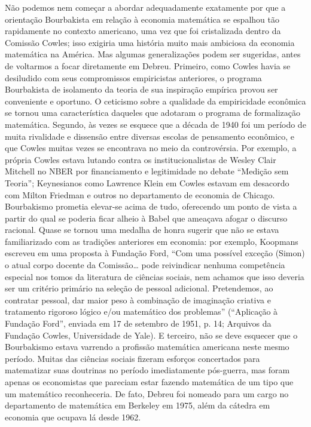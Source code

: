 \documentclass[12pt]{article}
\begin{document}
Não podemos nem começar a abordar adequadamente exatamente por que a orientação Bourbakista em relação à economia matemática se espalhou tão rapidamente no contexto americano, uma vez que foi cristalizada dentro da Comissão Cowles; isso exigiria uma história muito mais ambiciosa da economia matemática na América. Mas algumas generalizações podem ser sugeridas, antes de voltarmos a focar diretamente em Debreu. Primeiro, como Cowles havia se desiludido com seus compromissos empiricistas anteriores, o programa Bourbakista de isolamento da teoria de sua inspiração empírica provou ser conveniente e oportuno. O ceticismo sobre a qualidade da empiricidade econômica se tornou uma característica daqueles que adotaram o programa de formalização matemática. Segundo, às vezes se esquece que a década de 1940 foi um período de muita rivalidade e dissensão entre diversas escolas de pensamento econômico, e que Cowles muitas vezes se encontrava no meio da controvérsia. Por exemplo, a própria Cowles estava lutando contra os institucionalistas de Wesley Clair Mitchell no NBER por financiamento e legitimidade no debate “Medição sem Teoria”; Keynesianos como Lawrence Klein em Cowles estavam em desacordo com Milton Friedman e outros no departamento de economia de Chicago. Bourbakismo prometia elevar-se acima de tudo, oferecendo um ponto de vista a partir do qual se poderia ficar alheio à Babel que ameaçava afogar o discurso racional. Quase se tornou uma medalha de honra sugerir que não se estava familiarizado com as tradições anteriores em economia: por exemplo, Koopmans escreveu em uma proposta à Fundação Ford, “Com uma possível exceção (Simon) o atual corpo docente da Comissão… pode reivindicar nenhuma competência especial nos tomos da literatura de ciências sociais, nem achamos que isso deveria ser um critério primário na seleção de pessoal adicional. Pretendemos, ao contratar pessoal, dar maior peso à combinação de imaginação criativa e tratamento rigoroso lógico e/ou matemático dos problemas” (“Aplicação à Fundação Ford”, enviada em 17 de setembro de 1951, p. 14; Arquivos da Fundação Cowles, Universidade de Yale). E terceiro, não se deve esquecer que o Bourbakismo estava varrendo a profissão matemática americana neste mesmo período. Muitas das ciências sociais fizeram esforços concertados para matematizar suas doutrinas no período imediatamente pós-guerra, mas foram apenas os economistas que pareciam estar fazendo matemática de um tipo que um matemático reconheceria. De fato, Debreu foi nomeado para um cargo no departamento de matemática em Berkeley em 1975, além da cátedra em economia que ocupava lá desde 1962.
\end{document}

